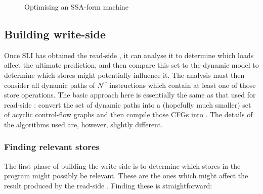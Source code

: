 \begin{figure}
\caption{Optimising an SSA-form machine}
\label{fig:ssa_cfg1}
\end{figure}


\subsection{Building write-side \StateMachines}

Once SLI has obtained the read-side \StateMachine, it can analyse it to determine which loads affect the ultimate prediction, and then compare this set to the dynamic model to determine which stores might potentially influence it.
The analysis must then consider all dynamic paths of $N^w$ instructions which contain at least one of those store operations.
The basic approach here is essentially the same as that used for read-side \StateMachines: convert the set of dynamic paths into a (hopefully much smaller) set of acyclic control-flow graphs and then compile those CFGs into \StateMachines.
The details of the algorithms used are, however, slightly different.

\subsubsection{Finding relevant stores}

The first phase of building the write-side \StateMachines is to determine which stores in the program might possibly be relevant.
These are the ones which might affect the result produced by the read-side \StateMachine.
Finding these is straightforward:

